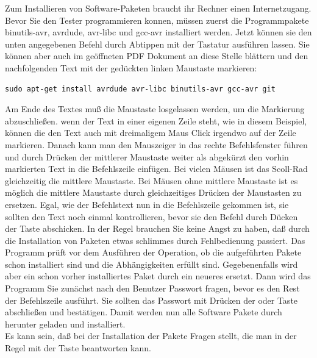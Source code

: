 Zum Installieren von Software-Paketen braucht ihr Rechner einen Internetzugang.
Bevor Sie den Tester programmieren konnen, müssen zuerst die Programmpakete
binutils-avr, avrdude, avr-libc und gcc-avr installiert werden.
Jetzt können sie den unten angegebenen Befehl durch Abtippen
mit der Tastatur ausführen lassen.
Sie können aber auch im geöffneten PDF Dokument an diese Stelle blättern
und den nachfolgenden Text mit der gedückten linken Maustaste \LMB markieren:
\begin{large} \vspace{-0.4em} \begin{verbatim}
sudo apt-get install avrdude avr-libc binutils-avr gcc-avr git
\end{verbatim} \end{large}
Am Ende des Textes muß die Maustaste \LMB losgelassen werden,
um die Markierung abzuschließen.
wenn der Text in einer eigenen Zeile steht, wie in diesem Beispiel, können
die den Text auch mit dreimaligem \LMB Maus Click irgendwo auf der Zeile markieren.
Danach kann man den Mauszeiger in das rechte Befehlsfenster führen und
durch Drücken der mittlerer Maustaste {weiter als \MMB abgekürzt} den vorhin
markierten Text in die Befehlszeile einfügen.
Bei vielen Mäusen ist das Scoll-Rad gleichzeitig die mittlere Maustaste.
Bei Mäusen ohne mittlere Maustaste ist es möglich die mittlere Maustaste
durch gleichzeitiges Drücken der \LRMB Maustasten zu ersetzen.
Egal, wie der Befehlstext nun in die Befehlszeile gekommen ist,
sie sollten den Text noch einmal kontrollieren, bevor
sie den Befehl durch Dücken der \keys{\enter} Taste abschicken.
In der Regel brauchen Sie keine Angst zu haben, daß durch die Installation
von Paketen etwas schlimmes durch Fehlbedienung passiert.
Das Programm  prüft vor dem Ausführen der Operation, ob die aufgeführten
Pakete schon installiert sind und die Abhängigkeiten erfüllt sind.
Gegebenenfalls wird aber ein schon vorher installiertes Paket durch ein neueres ersetzt.
Dann wird das  Programm Sie zunächst nach den Benutzer Passwort fragen,
bevor es den Rest der Befehlszeile ausführt.
Sie sollten das Passwort mit Drücken der \keys{\enter} oder \keys{\return} Taste abschließen und bestätigen.
Damit werden nun alle Software Pakete durch  herunter geladen und installiert.\\

Es kann sein, daß  bei der Installation der Pakete Fragen stellt,
die man in der Regel mit der Taste  beantworten kann.

